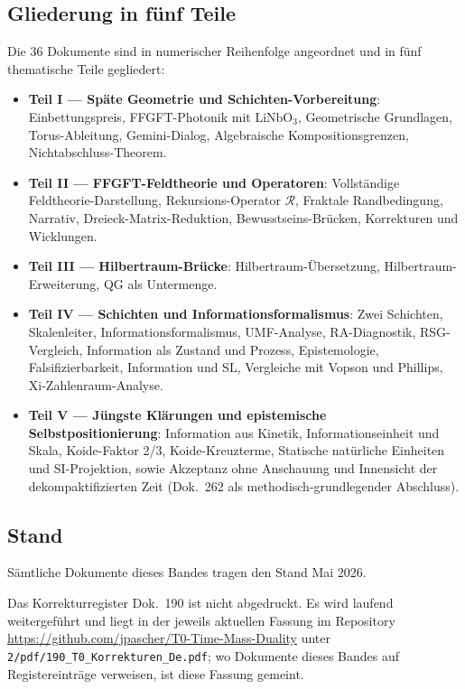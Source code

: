 \subsection*{Gliederung in fünf Teile}

Die 36 Dokumente sind in numerischer Reihenfolge angeordnet und in fünf
thematische Teile gegliedert:

\begin{itemize}
\item \textbf{Teil I --- Späte Geometrie und Schichten-Vorbereitung}:
      Einbettungspreis, FFGFT-Photonik mit $\mathrm{LiNbO}_3$, Geometrische
      Grundlagen, Torus-Ableitung, Gemini-Dialog,
      Algebraische Kompositionsgrenzen, Nichtabschluss-Theorem.
\item \textbf{Teil II --- FFGFT-Feldtheorie und Operatoren}: Vollständige
      Feldtheorie-Darstellung, Rekursions-Operator $\mathcal{R}$, Fraktale
      Randbedingung, Narrativ, Dreieck-Matrix-Reduktion, Bewusstseins-Brücken,
      Korrekturen und Wicklungen.
\item \textbf{Teil III --- Hilbertraum-Brücke}: Hilbertraum-Übersetzung,
      Hilbertraum-Erweiterung, QG als Untermenge.
\item \textbf{Teil IV --- Schichten und Informationsformalismus}: Zwei
      Schichten, Skalenleiter, Informationsformalismus, UMF-Analyse,
      RA-Diagnostik, RSG-Vergleich, Information als Zustand und Prozess,
      Epistemologie, Falsifizierbarkeit, Information und SL,
      Vergleiche mit Vopson und Phillips, Xi-Zahlenraum-Analyse.
\item \textbf{Teil V --- Jüngste Klärungen und epistemische
      Selbstpositionierung}: Information aus Kinetik, Informationseinheit
      und Skala, Koide-Faktor 2/3, Koide-Kreuzterme, Statische natürliche
      Einheiten und SI-Projektion, sowie Akzeptanz ohne Anschauung und
      Innensicht der dekompaktifizierten Zeit (Dok.~262 als
      methodisch-grundlegender Abschluss).
\end{itemize}

\subsection*{Stand}

Sämtliche Dokumente dieses Bandes tragen den Stand Mai 2026.

Das Korrekturregister Dok.~190 ist nicht abgedruckt. Es wird laufend
weitergeführt und liegt in der jeweils aktuellen Fassung im Repository
\url{https://github.com/jpascher/T0-Time-Mass-Duality} unter
\texttt{2/pdf/190\_T0\_Korrekturen\_De.pdf}; wo Dokumente dieses Bandes
auf Registereinträge verweisen, ist diese Fassung gemeint.
